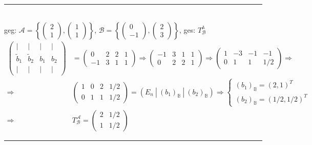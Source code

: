 \documentclass{article}
\begin{document}
{\color{blue}
\hrule
	\\
	geg: $\mathcal{A} = \left\{
	\begin{pmatrix}
		2\\1
	\end{pmatrix},
	\begin{pmatrix}
		1\\1
	\end{pmatrix}
	\right\}$,
	$\mathcal{B} = \left\{
	\begin{pmatrix}
		0\\-1
	\end{pmatrix},
	\begin{pmatrix}
		2\\3
	\end{pmatrix}
	\right\}$, \qquad ges: $T_\mathcal{B}^\mathbb{A}$
	\begin{align*}
		\left(\begin{array}{cc|c|c}
			| & | & | & | \\
			\tilde{b}_1 & \tilde{b}_2 & b_1 & b_2 \\
			| & | & | & |
		\end{array}\right)		
		 &= 
		\left(\begin{array}{cc|c|c}
			0 & 2 & 2 & 1 \\
			-1 & 3 & 1 & 1
		\end{array}\right)
		\Rightarrow
		\left(\begin{array}{cc|c|c}
			-1 & 3 & 1 & 1 \\
			0 & 2 & 2 & 1
		\end{array}\right)
		\Rightarrow
		\left(\begin{array}{cc|c|c}
			1 & -3 & -1 & -1 \\
			0 & 1 & 1 & 1/2
		\end{array}\right)
		\Rightarrow \\
		\Rightarrow
		&
		\left(\begin{array}{cc|c|c}
			1 & 0 & 2 & 1/2 \\
			0 & 1 & 1 & 1/2
		\end{array}\right)
		=
		(E_n\ |\ (b_1)_\mathbb{B}\ |\ (b_2)_\mathbb{B} )
		\Rightarrow
		\begin{cases}
			(b_1)_\mathbb{B} = (2,1)^T \\
			(b_2)_\mathbb{B} = (1/2,1/2)^T
		\end{cases}\\
		\Rightarrow
		&
		T_\mathcal{B}^\mathcal{A} =
		\begin{pmatrix}
			2 & 1/2 \\
			1 & 1/2
		\end{pmatrix}
	\end{align*}


\hrule
}
\end{document}
